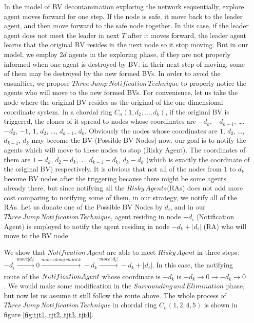 \documentclass[conference]{IEEEtran}
\begin{document}
In the model of BV decontamination exploring the network sequentially, explore agent moves forward for one step. If the node is safe, it move back to the leader agent, and then move forward to the safe node together. In this case, if the leader agent does not meet the leader in next $T$ after it moves forward, the leader agent learns that the original BV resides in the next node so it stop moving. 
But in our model, we employ $2d$ agents in the exploring phase, if they are not properly informed when one agent is destroyed by BV, in their next step of moving, some of them may be destroyed by the new formed BVs. In order to avoid the casualties, we propose $Three\,Jump\,Notification\,Technique$ to properly notice the agents who will move to the new formed BVs.
For convenience, let us take the node where the original BV resides as the original of the one-dimensional coordinate system. In a chordal ring $C_n(1, d_2, \ldots,  d_k)$, if the original BV is triggered, the clones of it spread to nodes whose coordinates are $-d_k$, $-d_{k-1}$, \ldots, $-d_2$, $-1$, $1$, $d_2$, \ldots, $d_{k-1}$, $d_k$. Obviously the nodes whose coordinates are $1$, $d_2$, \dots, $d_{k-1}$, $d_k$ may become the BV (Possible BV Nodes) now, our goal is to notify the agents which will move to these nodes to stop (Risky Agent). The coordinates of them are $1- d_k$, $d_2-d_k$, \ldots, $d_{k-1}-d_k$, $d_k-d_k$ (which is exactly the coordinate of the original BV) respectively. It is obvious that not all of the nodes from $1$ to $d_k$ become BV nodes after the triggering because there might be some agents already there, but since notifying all the $Risky\,Agents$(RAs) does not add more cost comparing to notifying some of them, in our strategy, we notify all of the RAs. Let us donate one of the Possible BV Nodes by $d_i$, and in our $ Three\,Jump\,Notification\,Technique$, agent residing in node $-d_i$ (Notification Agent) is employed to notify the agent residing in node $-d_k+\left |d_i\right |$ (RA) who will move to the BV node. 

We show that $Notification\,Agent$ are able to meet $Risky\,Agent$ in three steps: $-d_i\xrightarrow[]{move\left | d_i \right |}0\xrightarrow[]{move\,along\,chord\,k}-d_k\xrightarrow[]{move\,\left | d_i \right |}-d_k+\left|d_i\right|$. In this case, the notifying route of the $Notification\,\\Agent$ whose coordinate is $-d_k$ is $-d_k{\rightarrow}0{\rightarrow}-d_k{\rightarrow}0$ . We would make some modification in the $Surrounding\,and\,Elimination$ phase, but now let us assume it still follow the route above. The whole process of $Three\,Jump\,Notification\, Technique$ in chordal ring $C_n(1, 2, 4, 5)$ is shown in figure \ref{fig:tjt1, tjt2, tjt3, tjt4}. 
\end{document}
